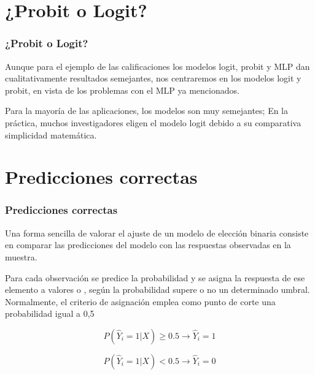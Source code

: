 \documentclass[10pt]{beamer}
\begin{document}
\section{¿Probit o Logit?}
\begin{frame}
\frametitle{¿Probit o Logit?}

Aunque para el ejemplo de las calificaciones los modelos logit, probit y MLP dan cualitativamente resultados semejantes, nos centraremos en los modelos logit y probit, en vista de los problemas con el MLP ya mencionados. \\

\vspace{4mm}


\vspace{4mm}

Para la mayoría de las aplicaciones, los modelos son muy semejantes; En la práctica, muchos investigadores eligen el modelo logit debido a su comparativa simplicidad matemática.

\end{frame}





\section{Predicciones correctas}
\begin{frame}
\frametitle{Predicciones correctas}

Una forma sencilla de valorar el ajuste de un modelo de elección binaria consiste en comparar las predicciones del modelo con las respuestas observadas en la muestra.  \\

\vspace{4mm}

Para cada observación se predice la probabilidad y se asigna la respuesta de ese elemento a valores o , según la probabilidad supere o no un determinado umbral. Normalmente, el criterio de asignación emplea como punto de corte una probabilidad igual a 0,5

\begin{equation}
P(\hat{Y}_i = 1 | X) \geq 0.5  \longrightarrow \hat{Y}_i = 1
\end{equation}

\begin{equation}
P(\hat{Y}_i = 1 | X) < 0.5  \longrightarrow \hat{Y}_i = 0
\end{equation}



\end{frame}
\end{document}
